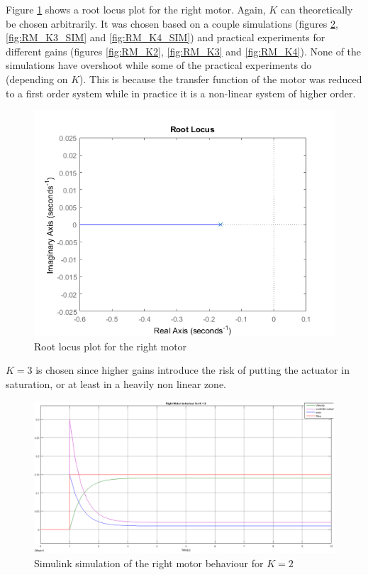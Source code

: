 Figure \ref{fig:RM_rlocus} shows a root locus plot for the right motor. Again, $K$ can theoretically be chosen arbitrarily. It was chosen based on a couple simulations (figures \ref{fig:RM_K2_SIM}, \ref{fig:RM_K3_SIM} and \ref{fig:RM_K4_SIM}) and  practical experiments for different gains (figures \ref{fig:RM_K2},
\ref{fig:RM_K3} and \ref{fig:RM_K4}). None of the simulations have overshoot while some of the practical experiments do (depending on $K$). This is because the transfer function of the motor was reduced to a first order system while in practice it is a non-linear system of higher order.
\begin{figure}[htbp]
\centering
\includegraphics[width = \textwidth]{pics/RM_rlocus.png}
\caption{Root locus plot for the right motor}
\label{fig:RM_rlocus}
\end{figure}

$K = 3$ is chosen since higher gains introduce the risk of putting the actuator in saturation, or at least in a heavily non linear zone.

\begin{figure}[htbp]
\centering
\includegraphics[width = \textwidth]{pics/RM_K2_SIM.png}
\caption{Simulink simulation of the right motor behaviour for $K = 2$}
\label{fig:RM_K2_SIM}
\end{figure}

